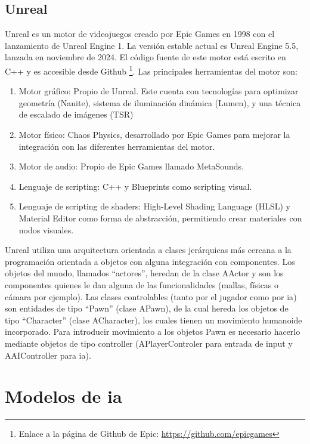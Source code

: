 \subsection{Unreal}
Unreal es un motor de videojuegos creado por Epic Games en 1998 con el lanzamiento de Unreal Engine 1.
La versión estable actual es Unreal Engine 5.5, lanzada en noviembre de 2024.
El código fuente de este motor está escrito en C++ y es accesible desde Github \footnote{Enlace a la página de Github de Epic: \url{https://github.com/epicgames}}.
Las principales herramientas del motor son:


\begin{enumerate}
    \item Motor gráfico: Propio de Unreal. Este cuenta con  tecnologías para optimizar geometría (Nanite), sistema de iluminación dinámica (Lumen), y una técnica de escalado de imágenes (TSR)
    \item Motor físico: Chaos Physics, desarrollado por Epic Games para mejorar la integración con las diferentes herramientas del motor.
    \item Motor de audio: Propio de Epic Games llamado MetaSounds.
    \item Lenguaje de scripting: C++ y Blueprints como scripting visual.
    \item Lenguaje de scripting de shaders: High-Level Shading Language (HLSL) y Material Editor como forma de abstracción, permitiendo crear materiales con nodos visuales.
\end{enumerate}

Unreal utiliza una arquitectura orientada a clases jerárquicas más cercana a la programación orientada a objetos con alguna integración con componentes.
Los objetos del mundo, llamados ``actores'', heredan de la clase AActor y son los componentes quienes le dan alguna de las funcionalidades (mallas, físicas o cámara por ejemplo).
Las clases controlables (tanto por el jugador como por \gls{ia}) son entidades de tipo ``Pawn'' (clase APawn), de la cual hereda los objetos de tipo ``Character'' (clase ACharacter), los cuales tienen un movimiento humanoide incorporado.
Para introducir movimiento a los objetos Pawn es necesario hacerlo mediante objetos de tipo controller (APlayerControler para entrada de input y AAIController para \gls{ia}).

\section{Modelos de \gls{ia}}

